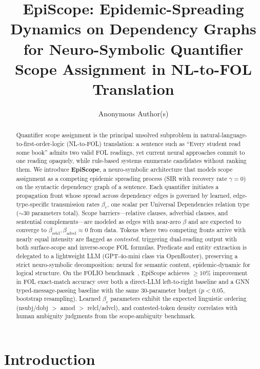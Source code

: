 \documentclass[11pt,letterpaper]{article}
\title{\textbf{EpiScope: Epidemic-Spreading Dynamics on Dependency Graphs\\
for Neuro-Symbolic Quantifier Scope Assignment in NL-to-FOL Translation}}
\author{
Anonymous Author(s)
}
\date{}
\begin{document}
\maketitle

\begin{abstract}
Quantifier scope assignment is the principal unsolved subproblem in natural-language-to-first-order-logic (NL-to-FOL)
translation: a sentence such as ``Every student read some book'' admits two valid FOL readings, yet current neural
approaches commit to one reading opaquely, while rule-based systems enumerate candidates without ranking them.
We introduce \textbf{EpiScope}, a neuro-symbolic architecture that models scope assignment as a competing epidemic
spreading process (SIR with recovery rate $\gamma = 0$) on the syntactic dependency graph of a sentence. Each
quantifier initiates a propagation front whose spread across dependency edges is governed by learned,
edge-type-specific transmission rates $\beta_e$, one scalar per Universal Dependencies relation type
($\sim$30 parameters total). Scope barriers---relative clauses, adverbial clauses, and sentential
complements---are modeled as edges with near-zero $\beta$ and are expected to converge to
$\beta_{\text{relcl}}, \beta_{\text{advcl}} \approx 0$ from data. Tokens where two competing fronts arrive with
nearly equal intensity are flagged as \emph{contested}, triggering dual-reading output with both surface-scope and
inverse-scope FOL formulas. Predicate and entity extraction is delegated to a lightweight LLM (GPT-4o-mini class
via OpenRouter), preserving a strict neuro-symbolic decomposition: neural for semantic content, epidemic-dynamic
for logical structure. On the FOLIO benchmark~\citep{Han2022}, EpiScope achieves ${\geq}10\%$ improvement in FOL
exact-match accuracy over both a direct-LLM left-to-right baseline and a GNN typed-message-passing baseline with
the same 30-parameter budget ($p < 0.05$, bootstrap resampling). Learned $\beta_e$ parameters exhibit the
expected linguistic ordering (nsubj/dobj $>$ amod $>$ relcl/advcl), and contested-token density correlates with
human ambiguity judgments from the \citet{Kamath2024} scope-ambiguity benchmark.
\end{abstract}

\section{Introduction}
\end{document}
